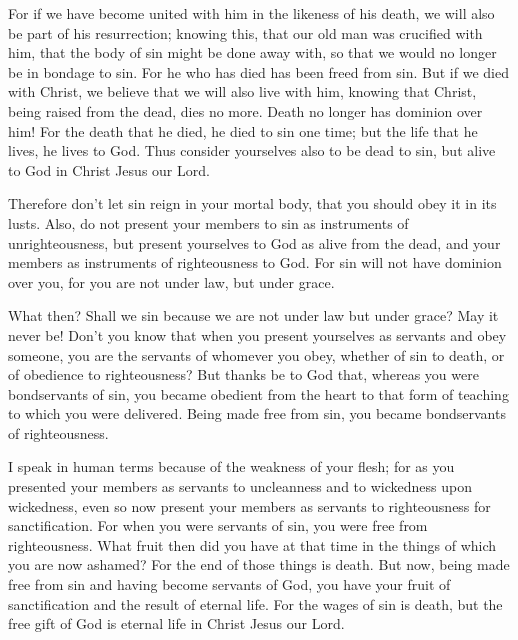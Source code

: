  For if we have become united with him in the likeness of
his death, we will also be part of his resurrection; 
knowing this, that our old man was crucified with him, that the body of
sin might be done away with, so that we would no longer be in bondage to
sin.  For he who has died has been freed from sin.
 But if we died with Christ, we believe that we will also
live with him,  knowing that Christ, being raised from the
dead, dies no more. Death no longer has dominion over him!
 For the death that he died, he died to sin one time; but
the life that he lives, he lives to God.  Thus consider
yourselves also to be dead to sin, but alive to God in Christ Jesus our
Lord.

 Therefore don't let sin reign in your mortal body, that
you should obey it in its lusts.  Also, do not present
your members to sin as instruments of unrighteousness, but present
yourselves to God as alive from the dead, and your members as
instruments of righteousness to God.  For sin will not
have dominion over you, for you are not under law, but under grace.

 What then? Shall we sin because we are not under law but
under grace? May it never be!  Don't you know that when
you present yourselves as servants and obey someone, you are the
servants of whomever you obey, whether of sin to death, or of obedience
to righteousness?  But thanks be to God that, whereas you
were bondservants of sin, you became obedient from the heart to that
form of teaching to which you were delivered.  Being made
free from sin, you became bondservants of righteousness.

 I speak in human terms because of the weakness of your
flesh; for as you presented your members as servants to uncleanness and
to wickedness upon wickedness, even so now present your members as
servants to righteousness for sanctification.  For when
you were servants of sin, you were free from righteousness.
 What fruit then did you have at that time in the things
of which you are now ashamed? For the end of those things is death.
 But now, being made free from sin and having become
servants of God, you have your fruit of sanctification and the result of
eternal life.  For the wages of sin is death, but the
free gift of God is eternal life in Christ Jesus our Lord.

